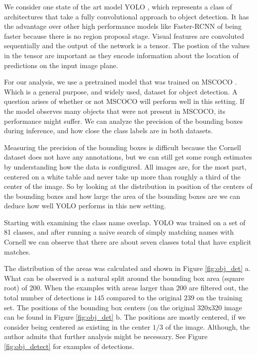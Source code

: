 \documentclass{article}
\begin{document}
We consider one state of the art model YOLO \cite{redmon16}, which represents a class
of architectures that take a fully convolutional approach to object detection. It has
the advantage over other high performance models like Faster-RCNN \cite{girshick15} of
being faster because there is no region proposal stage. Visual features are convoluted
sequentially and the output of the network is a tensor. The postion of the values in the
tensor are important as they encode information about the location of predictions on the
input image plane.

For our analysis, we use a pretrained model that was trained on MSCOCO \cite{lin14}. Which
is a general purpose, and widely used, dataset for object detection. A question arises of
whether or not MSCOCO will perform well in this setting. If the model
observes many objects that were not present in MSCOCO, its performance might suffer.
We can analyze the precision of the bounding boxes during inference, and how close
the class labels are in both datasets.

Measuring the precision of the bounding boxes is difficult because the Cornell dataset
does not have any annotations, but we can still get some rough estimates by understanding
how the data is configured. All images are, for the most part, centered on a white table
and never take up more than roughly a third of the center of the image. So by looking
at the distribution in position of the centers of the bounding boxes and how large the
area of the bounding boxes are we can deduce how well YOLO performs in this new setting.

Starting with examining the class name overlap. YOLO was trained on a set of 81 classes,
and after running a naive search of simply matching names with Cornell we can observe
that there are about seven classes total that have explicit matches.

The distribution of the areas was calculated and shown in Figure \ref{fig:obj_det} a.
What can be observed is a natural split around the bounding box area (square root) of
200. When the examples with areas larger than 200 are filtered out, the total number
of detections is $145$ compared to the original $239$ on the training set. The positions
of the bounding box centers (on the original 320x320 image can be found in Figure
\ref{fig:obj_det} b. The positions are mostly centered, if we consider being centered
as existing in the center $1/3$ of the image. Although, the author admits
that further analysis might be necessary. See Figure \ref{fig:obj_detect} for examples
of detections.
\end{document}
